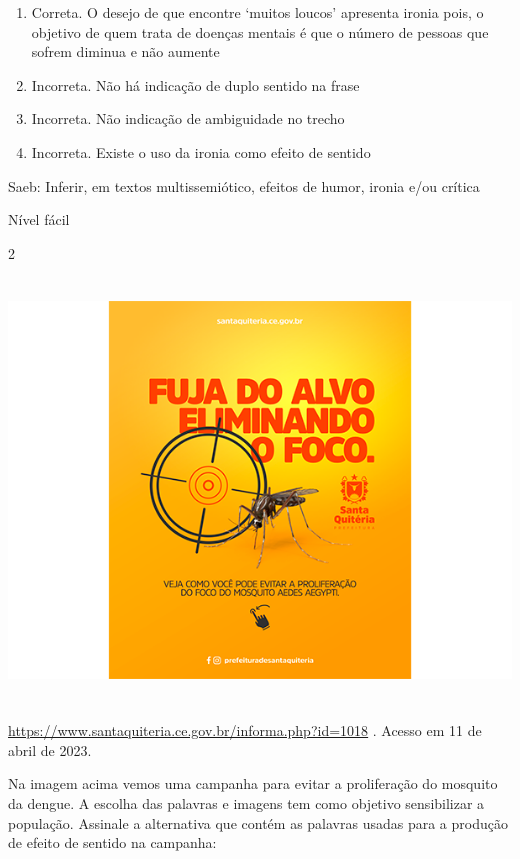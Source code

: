 {{\begin{escolha}
\begin{enumerate}
\def\labelenumi{\alph{enumi})}
\item
  Correta. O desejo de que encontre `muitos loucos' apresenta ironia
  pois, o objetivo de quem trata de doenças mentais é que o número de
  pessoas que sofrem diminua e não aumente
\item
  Incorreta. Não há indicação de duplo sentido na frase
\item
  Incorreta. Não indicação de ambiguidade no trecho
\item
  Incorreta. Existe o uso da ironia como efeito de sentido
\end{enumerate}

Saeb: Inferir, em textos multissemiótico, efeitos de humor, ironia e/ou
crítica

Nível fácil

\num{2}

\includegraphics[width=5.90551in,height=4.43056in]{./imgSAEB_7_POR/media/image6.png}

\href{https://www.santaquiteria.ce.gov.br/informa.php?id=1018}{\uline{https://www.santaquiteria.ce.gov.br/informa.php?id=1018}}
. Acesso em 11 de abril de 2023.

Na imagem acima vemos uma campanha para evitar a proliferação do
mosquito da dengue. A escolha das palavras e imagens tem como objetivo
sensibilizar a população. Assinale a alternativa que contém as palavras
usadas para a produção de efeito de sentido na campanha:


\end{escolha}}}
